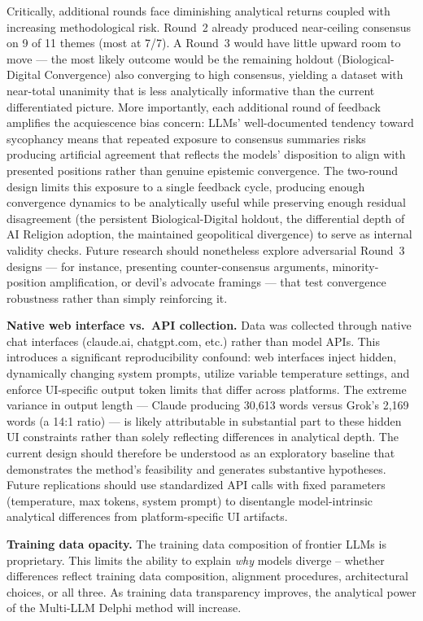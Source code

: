 \documentclass[preprint,review,12pt]{elsarticle}
\begin{document}
Critically, additional rounds face diminishing analytical returns coupled with increasing methodological risk. Round~2 already produced near-ceiling consensus on 9 of 11 themes (most at 7/7). A Round~3 would have little upward room to move --- the most likely outcome would be the remaining holdout (Biological-Digital Convergence) also converging to high consensus, yielding a dataset with near-total unanimity that is less analytically informative than the current differentiated picture. More importantly, each additional round of feedback amplifies the acquiescence bias concern: LLMs' well-documented tendency toward sycophancy \citep{perez2023sycophancy, sharma2024sycophancy} means that repeated exposure to consensus summaries risks producing artificial agreement that reflects the models' disposition to align with presented positions rather than genuine epistemic convergence. The two-round design limits this exposure to a single feedback cycle, producing enough convergence dynamics to be analytically useful while preserving enough residual disagreement (the persistent Biological-Digital holdout, the differential depth of AI Religion adoption, the maintained geopolitical divergence) to serve as internal validity checks. Future research should nonetheless explore adversarial Round~3 designs --- for instance, presenting counter-consensus arguments, minority-position amplification, or devil's advocate framings --- that test convergence robustness rather than simply reinforcing it.

\textbf{Native web interface vs.\ API collection.} Data was collected through native chat interfaces (claude.ai, chatgpt.com, etc.) rather than model APIs. This introduces a significant reproducibility confound: web interfaces inject hidden, dynamically changing system prompts, utilize variable temperature settings, and enforce UI-specific output token limits that differ across platforms. The extreme variance in output length --- Claude producing 30,613 words versus Grok's 2,169 words (a 14:1 ratio) --- is likely attributable in substantial part to these hidden UI constraints rather than solely reflecting differences in analytical depth. The current design should therefore be understood as an exploratory baseline that demonstrates the method's feasibility and generates substantive hypotheses. Future replications should use standardized API calls with fixed parameters (temperature, max tokens, system prompt) to disentangle model-intrinsic analytical differences from platform-specific UI artifacts.

\textbf{Training data opacity.} The training data composition of frontier LLMs is proprietary. This limits the ability to explain \textit{why} models diverge -- whether differences reflect training data composition, alignment procedures, architectural choices, or all three. As training data transparency improves, the analytical power of the Multi-LLM Delphi method will increase.
\end{document}
